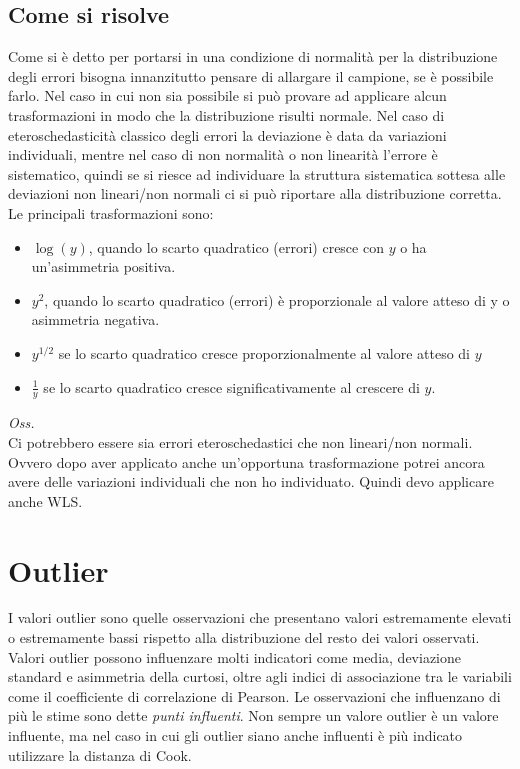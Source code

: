 \subsection{Come si risolve}
Come si è detto per portarsi in una condizione di normalità per la distribuzione degli errori bisogna innanzitutto pensare di allargare il campione, se è possibile farlo. Nel caso in cui non sia possibile si può provare ad applicare alcun trasformazioni in modo che la distribuzione risulti normale. Nel caso di eteroschedasticità classico degli errori la deviazione è data da variazioni individuali, mentre nel caso di non normalità o non linearità l'errore è sistematico, quindi se si riesce ad individuare la struttura sistematica sottesa alle deviazioni non lineari/non normali ci si può riportare alla distribuzione corretta. Le principali trasformazioni sono:
\begin{itemize}
	\item $\log(y)$, quando lo scarto quadratico (errori) cresce con $y$ o ha un'asimmetria positiva.
	\item $y^2$, quando lo scarto quadratico (errori) è proporzionale al valore atteso di y o asimmetria negativa.
	\item $y^{1/2}$ se lo scarto quadratico cresce proporzionalmente al valore atteso di $y$
	\item $\frac{1}{y}$ se lo scarto quadratico cresce significativamente al crescere di $y$.
\end{itemize}

\textit{Oss.}\\
Ci potrebbero essere sia errori eteroschedastici che non lineari/non normali. Ovvero dopo aver applicato anche un'opportuna trasformazione potrei ancora avere delle variazioni individuali che non ho individuato. Quindi devo applicare anche WLS.

\section{Outlier}
I valori outlier sono quelle osservazioni che presentano valori estremamente elevati o estremamente bassi rispetto alla distribuzione del resto dei valori osservati. Valori outlier possono influenzare molti indicatori come media, deviazione standard e asimmetria della curtosi, oltre agli indici di associazione tra le variabili come il coefficiente di correlazione di Pearson. Le osservazioni che influenzano di più le stime sono dette \textit{punti influenti}. Non sempre un valore outlier è un valore influente, ma nel caso in cui gli outlier siano anche influenti è più indicato utilizzare la distanza di Cook.
